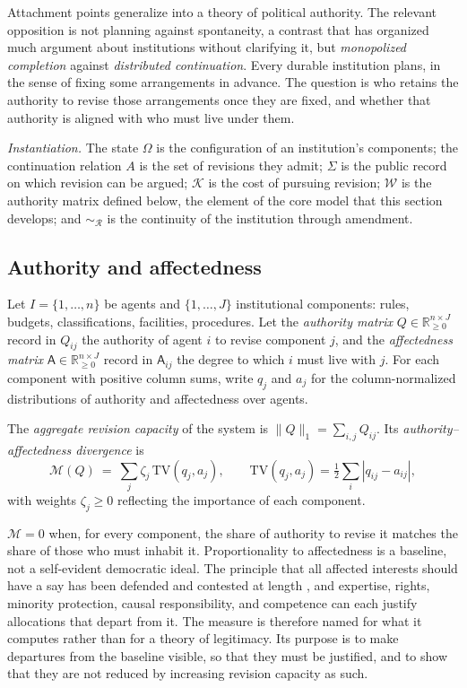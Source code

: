 Attachment points generalize into a theory of political authority. The relevant opposition is not planning against spontaneity, a contrast that has organized much argument about institutions without clarifying it, but \emph{monopolized completion} against \emph{distributed continuation}. Every durable institution plans, in the sense of fixing some arrangements in advance. The question is who retains the authority to revise those arrangements once they are fixed, and whether that authority is aligned with who must live under them.

\emph{Instantiation.} The state $\Omega$ is the configuration of an institution's components; the continuation relation $A$ is the set of revisions they admit; $\Sigma$ is the public record on which revision can be argued; $\mathcal{K}$ is the cost of pursuing revision; $\mathcal{W}$ is the authority matrix defined below, the element of the core model that this section develops; and $\sim_{\mathcal{R}}$ is the continuity of the institution through amendment.

\subsection{Authority and affectedness}

Let $I=\{1,\dots,n\}$ be agents and $\{1,\dots,J\}$ institutional components: rules, budgets, classifications, facilities, procedures. Let the \emph{authority matrix} $Q\in\mathbb{R}^{n\times J}_{\geq 0}$ record in $Q_{ij}$ the authority of agent $i$ to revise component $j$, and the \emph{affectedness matrix} $\mathsf{A}\in\mathbb{R}^{n\times J}_{\geq 0}$ record in $\mathsf{A}_{ij}$ the degree to which $i$ must live with $j$. For each component with positive column sums, write $q_j$ and $a_j$ for the column-normalized distributions of authority and affectedness over agents.

\begin{definition}
The \emph{aggregate revision capacity} of the system is $\|Q\|_1=\sum_{i,j}Q_{ij}$. Its \emph{authority--affectedness divergence} is
\begin{equation}
\mathcal{M}(Q)\ =\ \sum_{j}\zeta_j\,\mathrm{TV}(q_j,a_j),\qquad\mathrm{TV}(q_j,a_j)=\tfrac12\sum_i|q_{ij}-a_{ij}|,
\end{equation}
with weights $\zeta_j\geq 0$ reflecting the importance of each component.
\end{definition}

$\mathcal{M}=0$ when, for every component, the share of authority to revise it matches the share of those who must inhabit it. Proportionality to affectedness is a baseline, not a self-evident democratic ideal. The principle that all affected interests should have a say has been defended and contested at length \cite{goodin2007}, and expertise, rights, minority protection, causal responsibility, and competence can each justify allocations that depart from it. The measure is therefore named for what it computes rather than for a theory of legitimacy. Its purpose is to make departures from the baseline visible, so that they must be justified, and to show that they are not reduced by increasing revision capacity as such.

